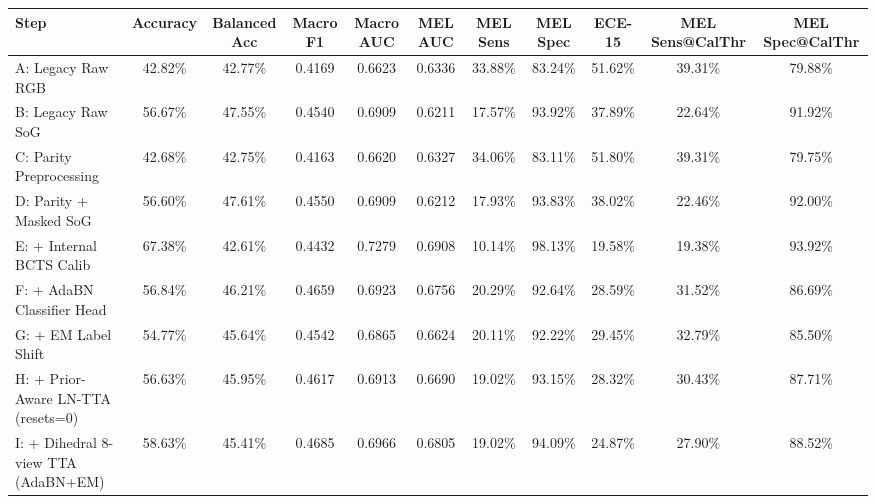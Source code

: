 \begin{tabular}{lcccccccccc}
\toprule
Step & Accuracy & Balanced Acc & Macro F1 & Macro AUC & MEL AUC & MEL Sens & MEL Spec & ECE-15 & MEL Sens@CalThr & MEL Spec@CalThr \\
\midrule
A: Legacy Raw RGB & 42.82\% & 42.77\% & 0.4169 & 0.6623 & 0.6336 & 33.88\% & 83.24\% & 51.62\% & 39.31\% & 79.88\% \\
B: Legacy Raw SoG & 56.67\% & 47.55\% & 0.4540 & 0.6909 & 0.6211 & 17.57\% & 93.92\% & 37.89\% & 22.64\% & 91.92\% \\
C: Parity Preprocessing & 42.68\% & 42.75\% & 0.4163 & 0.6620 & 0.6327 & 34.06\% & 83.11\% & 51.80\% & 39.31\% & 79.75\% \\
D: Parity + Masked SoG & 56.60\% & 47.61\% & 0.4550 & 0.6909 & 0.6212 & 17.93\% & 93.83\% & 38.02\% & 22.46\% & 92.00\% \\
E: + Internal BCTS Calib & 67.38\% & 42.61\% & 0.4432 & 0.7279 & 0.6908 & 10.14\% & 98.13\% & 19.58\% & 19.38\% & 93.92\% \\
F: + AdaBN Classifier Head & 56.84\% & 46.21\% & 0.4659 & 0.6923 & 0.6756 & 20.29\% & 92.64\% & 28.59\% & 31.52\% & 86.69\% \\
G: + EM Label Shift & 54.77\% & 45.64\% & 0.4542 & 0.6865 & 0.6624 & 20.11\% & 92.22\% & 29.45\% & 32.79\% & 85.50\% \\
H: + Prior-Aware LN-TTA (resets=0) & 56.63\% & 45.95\% & 0.4617 & 0.6913 & 0.6690 & 19.02\% & 93.15\% & 28.32\% & 30.43\% & 87.71\% \\
I: + Dihedral 8-view TTA (AdaBN+EM) & 58.63\% & 45.41\% & 0.4685 & 0.6966 & 0.6805 & 19.02\% & 94.09\% & 24.87\% & 27.90\% & 88.52\% \\
\bottomrule
\end{tabular}
